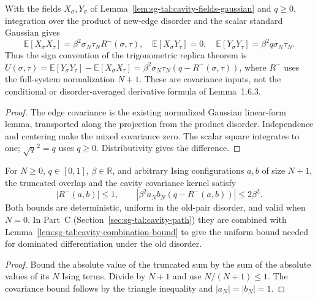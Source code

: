 \begin{lemma}
\label{lem:sg-tal:cavity-field-covariance-difference}
  \leanok
{}
With the fields $X_\sigma,Y_\sigma$ of Lemma~\ref{lem:sg-tal:cavity-fields-gaussian} and $q\ge0$, integration over the
product of new-edge disorder and the scalar standard Gaussian gives
\[
\mathbb E[X_\sigma X_\tau]=\beta^2\sigma_N\tau_N R^-(\sigma,\tau),
\quad \mathbb E[X_\sigma Y_\tau]=0,\quad
\mathbb E[Y_\sigma Y_\tau]=\beta^2 q\sigma_N\tau_N.
\]
Thus the sign convention of the trigonometric replica theorem is
$U(\sigma,\tau)=\mathbb E[Y_\sigma Y_\tau]-\mathbb E[X_\sigma X_\tau]
=\beta^2\sigma_N\tau_N(q-R^-(\sigma,\tau))$, where $R^-$ uses the
full-system normalization $N+1$. These are covariance inputs, not the
conditional or disorder-averaged derivative formula of Lemma~1.6.3.
\end{lemma}
\begin{proof}
  \leanok
The edge covariance is the existing normalized Gaussian linear-form lemma,
transported along the projection from the product disorder. Independence and
centering make the mixed covariance zero. The scalar square integrates to one;
$\sqrt q^{\,2}=q$ uses $q\ge0$. Distributivity gives the difference.
\end{proof}

\begin{lemma}
\label{lem:sg-tal:cavity-covariance-bound}
  \leanok
{}
For $N\ge0$, $q\in[0,1]$, $\beta\in\mathbb R$, and arbitrary Ising
configurations $a,b$ of size $N+1$, the truncated overlap and the cavity
covariance kernel satisfy
\[
|R^-(a,b)|\le1,\qquad
|\beta^2 a_N b_N(q-R^-(a,b))|\le2\beta^2.
\]
Both bounds are deterministic, uniform in the old-pair disorder, and valid
when $N=0$. In Part~C (Section~\ref{sec:sg-tal:cavity-path}) they are combined with
Lemma~\ref{lem:sg-tal:cavity-combination-bound} to give the uniform bound needed for dominated
differentiation under the old disorder.
\end{lemma}
\begin{proof}
  \leanok
Bound the absolute value of the truncated sum by the sum of the absolute
values of its $N$ Ising terms. Divide by $N+1$ and use $N/(N+1)\le1$.
The covariance bound follows by the triangle inequality and $|a_N|=|b_N|=1$.
\end{proof}

